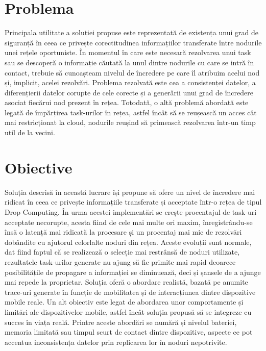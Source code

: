 \documentclass[12pt,a4paper]{report}
\begin{document}
\section{Problema} 
Principala utilitate a soluției propuse este reprezentată de existența unui grad de siguranță în ceea ce privește corectitudinea informațiilor transferate între nodurile unei rețele oportuniste. În momentul în care este necesară rezolvarea unui task sau se descoperă o informație căutată la unul dintre nodurile cu care se intră în contact, trebuie să cunoașteam nivelul de încredere pe care îl atribuim acelui nod și, implicit, acelei rezolvări. Problema rezolvată este cea a consistenței datelor, a diferențierii datelor corupte de cele corecte și a generării unui grad de încredere asociat fiecărui nod prezent în rețea. Totodată, o altă problemă abordată este legată de împărțirea task-urilor în rețea, astfel încât să se reușească un acces cât mai restricționat la cloud, nodurile reușind să primească rezolvarea într-un timp util de la vecini.

\section{Obiective}
Soluția descrisă în această lucrare își propune să ofere un nivel de încredere mai ridicat în ceea ce privește informațiile transferate și acceptate într-o rețea de tipul Drop Computing. În urma acestei implementări se crește procentajul de task-uri acceptate necorupte, acesta fiind de cele mai multe ori maxim, înregistrându-se însă o latență mai ridicată la procesare și un procentaj mai mic de rezolvări dobândite cu ajutorul celorlalte noduri din rețea. Aceste evoluții sunt normale, dat fiind faptul că se realizează o selecție mai restrânsă de noduri utilizate, rezultatele task-urilor generate nu ajung să fie primite mai rapid deoarece posibilitățile de propagare a informației se diminuează, deci și șansele de a ajunge mai repede la proprietar. Soluția oferă o abordare realistă, bazată pe anumite trace-uri generate în funcție de mobilitatea și de interacțiunea dintre dispozitive mobile reale. Un alt obiectiv este legat de abordarea unor comportamente și limitări ale dispozitivelor mobile, astfel încât soluția propusă să se integreze cu succes în viața reală. Printre aceste abordări se numără și nivelul bateriei, memoria limitată sau timpul scurt de contact dintre dispozitive, aspecte ce pot accentua inconsistența datelor prin replicarea lor în noduri nepotrivite.
\end{document}
